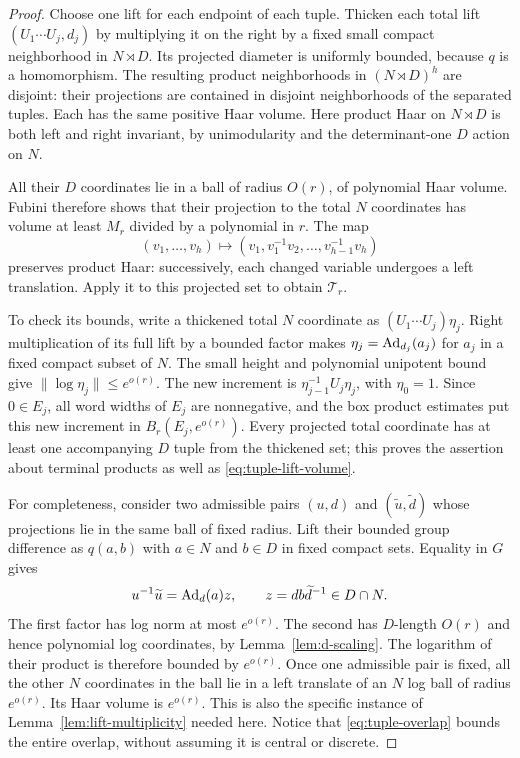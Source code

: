 \begin{proof}
Choose one lift for each endpoint of each tuple.  Thicken each total lift
$(U_1\cdots U_j,d_j)$ by multiplying it on the right by a fixed small
compact neighborhood in $N\rtimes D$.  Its projected diameter is uniformly
bounded, because $q$ is a homomorphism.  The resulting product
neighborhoods in $(N\rtimes D)^h$ are disjoint: their projections are
contained in disjoint neighborhoods of the separated tuples.  Each has
the same positive Haar volume.  Here product Haar on $N\rtimes D$ is
both left and right invariant, by unimodularity and the determinant-one
$D$ action on $N$.

All their $D$ coordinates lie in a ball of radius $O(r)$, of polynomial
Haar volume.  Fubini therefore shows that their projection to the total
$N$ coordinates has volume at least $M_r$ divided by a polynomial in
$r$.  The map
\[
 (v_1,\ldots,v_h)\longmapsto
 (v_1,v_1^{-1}v_2,\ldots,v_{h-1}^{-1}v_h)
\]
preserves product Haar: successively, each changed variable undergoes a
left translation.  Apply it to this projected set to obtain
$\mathcal T_r$.

To check its bounds, write a thickened total $N$ coordinate as
$(U_1\cdots U_j)\eta_j$.  Right multiplication of its full lift by a
bounded factor makes
$\eta_j=\operatorname{Ad}_{d_j}(a_j)$ for $a_j$ in a fixed compact subset of $N$.
The small height and polynomial unipotent bound give
$\|\log\eta_j\|\leq e^{o(r)}$.  The new increment is
$\eta_{j-1}^{-1}U_j\eta_j$, with $\eta_0=1$.
Since $0\in E_j$, all word widths of $E_j$ are nonnegative, and the box
product estimates put this new increment in $B_r(E_j,e^{o(r)})$.
Every projected total coordinate has at least one accompanying $D$
tuple from the thickened set; this proves the assertion about terminal
products as well as \eqref{eq:tuple-lift-volume}.

For completeness, consider two admissible pairs $(u,d)$ and
$(\widetilde u,\widetilde d)$ whose projections lie in the same ball of
fixed radius.  Lift their bounded group difference as $q(a,b)$ with
$a\in N$ and $b\in D$ in fixed compact sets.  Equality in $G$ gives
\begin{equation}\label{eq:tuple-overlap}
 u^{-1}\widetilde u=\operatorname{Ad}_d(a)z,
 \qquad z=d b\widetilde d^{-1}\in D\cap N.
\end{equation}
The first factor has log norm at most $e^{o(r)}$.  The second has
$D$-length $O(r)$ and hence polynomial log coordinates, by
Lemma~\ref{lem:d-scaling}.  The logarithm of their product is therefore
bounded by $e^{o(r)}$.  Once one admissible pair is fixed, all the other
$N$ coordinates in the ball lie in a left translate of an $N$ log ball
of radius $e^{o(r)}$.  Its Haar volume is $e^{o(r)}$.  This is also the
specific instance of Lemma~\ref{lem:lift-multiplicity} needed here.
Notice that \eqref{eq:tuple-overlap} bounds the entire overlap, without
assuming it is central or discrete.
\end{proof}

